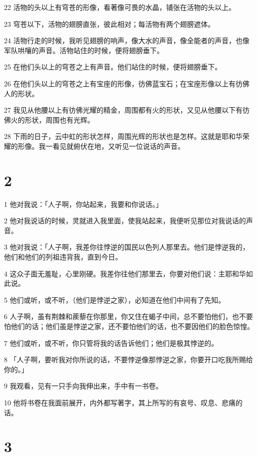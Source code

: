 \par 22 活物的头以上有穹苍的形像，看著像可畏的水晶，铺张在活物的头以上。
\par 23 穹苍以下，活物的翅膀直张，彼此相对；每活物有两个翅膀遮体。
\par 24 活物行走的时候，我听见翅膀的响声，像大水的声音，像全能者的声音，也像军队哄嚷的声音。活物站住的时候，便将翅膀垂下。
\par 25 在他们头以上的穹苍之上有声音。他们站住的时候，便将翅膀垂下。
\par 26 在他们头以上的穹苍之上有宝座的形像，彷佛蓝宝石；在宝座形像以上有彷佛人的形状。
\par 27 我见从他腰以上有彷佛光耀的精金，周围都有火的形状，又见从他腰以下有彷佛火的形状，周围也有光辉。
\par 28 下雨的日子，云中虹的形状怎样，周围光辉的形状也是怎样。这就是耶和华荣耀的形像。我一看见就俯伏在地，又听见一位说话的声音。

\chapter{2}

\par 1 他对我说：「人子啊，你站起来，我要和你说话。」
\par 2 他对我说话的时候，灵就进入我里面，使我站起来，我便听见那位对我说话的声音。
\par 3 他对我说：「人子啊，我差你往悖逆的国民以色列人那里去。他们是悖逆我的，他们和他们的列祖违背我，直到今日。
\par 4 这众子面无羞耻，心里刚硬。我差你往他们那里去，你要对他们说：主耶和华如此说。
\par 5 他们或听，或不听，（他们是悖逆之家），必知道在他们中间有了先知。
\par 6 人子啊，虽有荆棘和蒺藜在你那里，你又住在蝎子中间，总不要怕他们，也不要怕他们的话；他们虽是悖逆之家，还不要怕他们的话，也不要因他们的脸色惊惶。
\par 7 他们或听，或不听，你只管将我的话告诉他们；他们是极其悖逆的。
\par 8 「人子啊，要听我对你所说的话，不要悖逆像那悖逆之家，你要开口吃我所赐给你的。」
\par 9 我观看，见有一只手向我伸出来，手中有一书卷。
\par 10 他将书卷在我面前展开，内外都写著字，其上所写的有哀号、叹息、悲痛的话。

\chapter{3}

